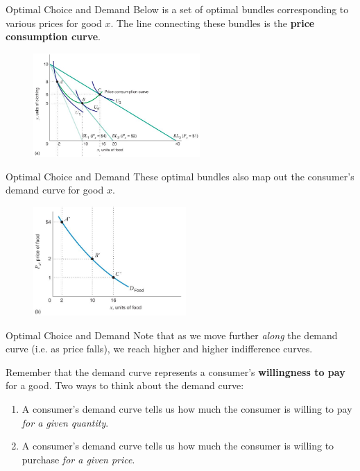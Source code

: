 \documentclass[11pt,t]{beamer}
\begin{document}
\begin{frame}{Optimal Choice and Demand}
Below is a set of optimal bundles corresponding to various prices for good $x$. The line connecting these bundles is the \textbf{price consumption curve}.
\begin{figure}
  \includegraphics[width=240px]{figures/fig5_1a.jpg}
\end{figure}
\end{frame}

\begin{frame}{Optimal Choice and Demand}
These optimal bundles also map out the consumer's demand curve for good $x$.
\begin{figure}
  \includegraphics[width=220px]{figures/fig5_1b.jpg}
\end{figure}
\end{frame}

\begin{frame}{Optimal Choice and Demand}
  Note that as we move further \textit{along} the demand curve (i.e. as price falls), we reach higher and higher indifference curves.


  \bigskip\pause
  Remember that the demand curve represents a consumer's \textbf{willingness to pay} for a good. Two ways to think about the demand curve:

  \bigskip
  \begin{enumerate}
    \item A consumer's demand curve tells us how much the consumer is willing to pay \emph{for a given quantity}.

    \item  A consumer's demand curve tells us how much the consumer is willing to purchase \emph{for a given price}.
  \end{enumerate}
\end{frame}
\end{document}
